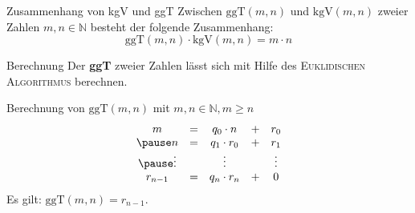 \documentclass[]{beamer}
\begin{document}
\begin{frame}[squeeze]{}
  \vspace*{-0.25em}
  \begin{block}{Zusammenhang von kgV und ggT}
    Zwischen $\mathrm{ggT} \left( m, n \right)$ und $\mathrm{kgV} \left( m, n \right)$ zweier Zahlen $m, n \in \mathbb{N}$ besteht der folgende Zusammenhang: \vspace*{-0.5em}
    \[\mathrm{ggT} \left( m, n \right) \cdot \mathrm{kgV} \left( m, n \right) = m \cdot n\]
  \end{block}
  \vspace*{-0.5em}
  \pause
  
  \begin{exampleblock}{Berechnung}
    Der \textbf{ggT} zweier Zahlen lässt sich mit Hilfe des \textsc{Euklidischen Algorithmus} berechnen.
  \end{exampleblock}
  \vspace*{-0.5em}
  \pause
  
  \begin{block}{Berechnung von $\mathrm{ggT} \left( m, n \right)$ mit $m, n \in \mathbb{N}, m \geq n$}
    \[\begin{array}{ c c c c c}
      m &= &q_0 \cdot n &+ &r_0 \\
      \pause
      n &= &q_1 \cdot r_0 &+ &r_1 \\
      \pause
      \vdots & & \vdots & & \vdots \\
      r_{n-1} &= &q_n \cdot r_n &+ &0 \\
    \end{array}\]
    \pause
    Es gilt: $\mathrm{ggT} \left(m, n \right) = r_{n-1}$.
  \end{block}
\end{frame}
\end{document}
